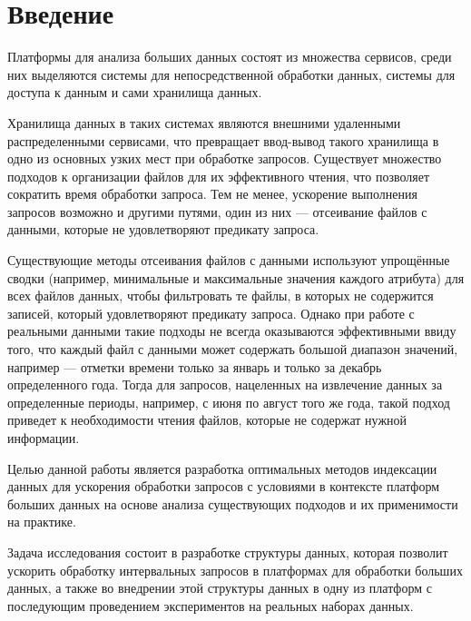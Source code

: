 \section*{Введение}

Платформы для анализа больших данных состоят из множества сервисов, среди них  выделяются системы для непосредственной обработки данных, системы для доступа к данным и сами хранилища данных.

Хранилища данных в таких системах являются внешними удаленными распределенными сервисами, что превращает ввод-вывод такого хранилища в одно из основных узких мест при обработке запросов. Существует множество подходов к организации файлов для их эффективного чтения, что позволяет сократить время  обработки запроса. Тем не менее, ускорение выполнения запросов возможно и другими путями, один из них --- отсеивание файлов с данными, которые не удовлетворяют предикату запроса.

Существующие методы отсеивания файлов с данными используют упрощённые сводки (например, минимальные и максимальные значения каждого атрибута) для всех файлов данных, чтобы фильтровать те файлы, в которых не содержится записей, который удовлетворяют предикату запроса. Однако при работе с реальными данными такие подходы не всегда оказываются эффективными ввиду того, что каждый файл с данными может содержать большой диапазон значений, например --- отметки времени только за январь и только за декабрь определенного года. Тогда для запросов, нацеленных на извлечение данных за определенные периоды, например, с июня по август того же года, такой подход приведет к необходимости чтения файлов, которые не содержат нужной информации.

Целью данной работы является разработка оптимальных методов индексации данных для ускорения обработки запросов с условиями в контексте платформ больших данных на основе анализа существующих подходов и их применимости на практике.

Задача исследования состоит в разработке структуры данных, которая позволит ускорить обработку интервальных запросов в платформах для обработки больших данных, а также во внедрении этой структуры данных в одну из платформ с последующим проведением экспериментов на реальных наборах данных.
